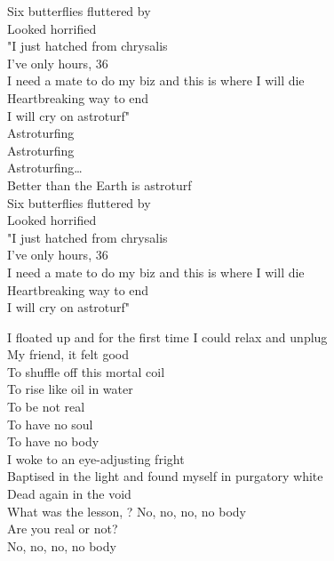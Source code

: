 Six butterflies fluttered by \\
Looked horrified \\
"I just hatched from chrysalis \\
I've only hours, 36 \\
I need a mate to do my biz and this is where I will die \\
Heartbreaking way to end \\
I will cry on astroturf" \\

Astroturfing \\
Astroturfing \\
Astroturfing… \\
Better than the Earth is astroturf \\

Six butterflies fluttered by \\
Looked horrified \\
"I just hatched from chrysalis \\
I've only hours, 36 \\
I need a mate to do my biz and this is where I will die \\
Heartbreaking way to end \\
I will cry on astroturf" \\




I floated up and for the first time I could relax and unplug \\
My friend, it felt good \\

To shuffle off this mortal coil \\
To rise like oil in water \\

To be not real \\
To have no soul \\
To have no body \\

I woke to an eye-adjusting fright \\
Baptised in the light and found myself in purgatory white \\
Dead again in the void \\

What was the lesson, ?
No, no, no, no body \\
Are you real or not? \\
No, no, no, no body \\

